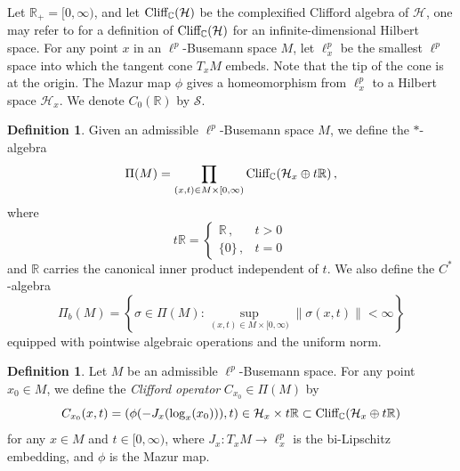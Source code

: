 \documentclass{article}
\theoremstyle{plain}
\theoremstyle{definition}
\newtheorem{definition}[theorem]{Definition}
\theoremstyle{remark}
\def\H{\mathcal H}
\def\IR{\mathbb R}
\def\IC{\mathbb C}
\def\Cl{\textup{Cliff}_{\IC}}
\def\S{\mathcal S}
\begin{document}
	Let $\IR_+=[0,\infty)$, and let $\Cl(\H)$ be the complexified Clifford algebra of $\H$, one may refer to \cite[Section~3.1]{guo2024bott} for a definition of $\Cl(\H)$ for an infinite-dimensional Hilbert space. For any point $x$ in an $\ell^p$-Busemann space $M$, let $\ell^p_x$ be the smallest $\ell^p$ space into which the tangent cone $T_xM$ embeds. Note that the tip of the cone is at the origin. The Mazur map $\phi$ gives a homeomorphism from $\ell^p_x$ to a Hilbert space $\H_x$.
	We denote $C_0(\IR)$ by $\S$.
	\begin{definition}\label{defn:Pi-M}
		Given an admissible $\ell^p$-Busemann space $M$, we define the $*$-algebra
		\[
		\Pi(M) = \prod_{(x,t) \in M \times [0,\infty) } \Cl (\H_x \oplus t \IR ) \, ,
		\]
		where 
		\[
		t \IR = 
		\begin{cases}
			\IR \, , & t > 0 \\
			\{0\} \, , & t = 0 
		\end{cases}
		\, 
		\]
		and $\IR$ carries the canonical inner product independent of $t$. 
		We also define the $C^*$-algebra  
		\[
		\Pi_b(M) = \left\{ \sigma \in \Pi(M) \colon \sup_{(x,t) \in M \times [0,\infty)} \| \sigma({x,t}) \| < \infty \right\}
		\] 
		equipped with pointwise algebraic operations and the uniform norm. 
	\end{definition}
	
	\begin{definition}\label{defn_Cliffordmultiplier}
		Let $M$ be an admissible $\ell^p$-Busemann space. For any point $x_0 \in M$, we define the \emph{Clifford operator} $C_{x_0} \in \Pi (M)$ by
		\[
		C_{x_0}(x , t) = \left(\phi(-J_x(\log_{x}(x_0))), t \right) \in \H_{x} \times t \IR \subset \Cl({\H_{x}\oplus t \IR})
		\]
		for any $x \in M$ and $t \in [0,\infty)$, where $J_x: T_xM\to \ell^p_x$ is the bi-Lipschitz embedding, and $\phi$ is the Mazur map.
	\end{definition}
	
\end{document}
